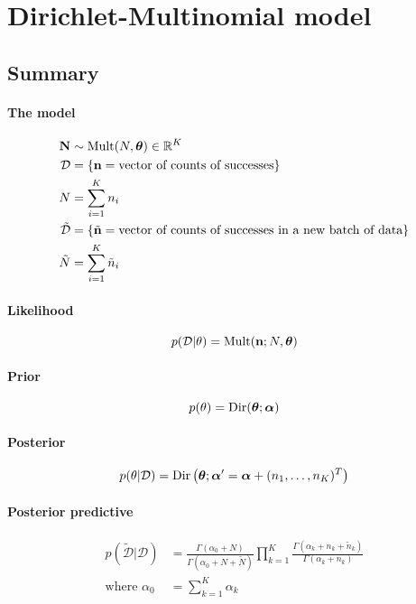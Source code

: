 \section{Dirichlet-Multinomial model}
\subsection{Summary}
\paragraph{The model}
    \begin{align}
        \boldsymbol{\mathbf{N}}      &\sim \operatorname{Mult}(N, \boldsymbol{\mathbf{\theta}}) \in \mathbb R^K \\
        \mathcal D  &= \{\boldsymbol{\mathbf{n}} = \text{vector of counts of successes}\} \\
        N           &= \sum_{i = 1}^K n_i \\
        \tilde{\mathcal D} &= \{\tilde{\boldsymbol{\mathbf{n}}} = \text{vector of counts of successes in a new batch of data}\} \\
        \tilde N          &= \sum_{i = 1}^K \tilde n_i
    \end{align}

\paragraph{Likelihood}
    \begin{equation}
        p(\mathcal D | \theta) = \operatorname{Mult}(\boldsymbol{\mathbf{n}}; N, \boldsymbol{\mathbf{\theta}})
    \end{equation}

\paragraph{Prior}
    \begin{equation}
        p(\theta)   = \operatorname{Dir}(\boldsymbol{\mathbf{\theta}}; \boldsymbol{\mathbf{\alpha}})
    \end{equation}

\paragraph{Posterior}
    \begin{equation}
        p(\theta | \mathcal D) = \operatorname{Dir}\left(\boldsymbol{\mathbf{\theta}}; \boldsymbol{\mathbf{\alpha}}' = \boldsymbol{\mathbf{\alpha}} + (n_1, \dotsc, n_K)^T\right)
    \end{equation}

\paragraph{Posterior predictive}
    \begin{align}
        p(\tilde{\mathcal D} | \mathcal D) &= \frac{\Gamma(\alpha_0 + N)}{\Gamma(\alpha_0 + N + \tilde N)} \prod_{k = 1}^K \frac{\Gamma(\alpha_k + n_k + \tilde n_k)}{\Gamma(\alpha_k + n_k)} \\
        \text{where } \alpha_0 &= \sum_{k = 1}^K \alpha_k
    \end{align}

